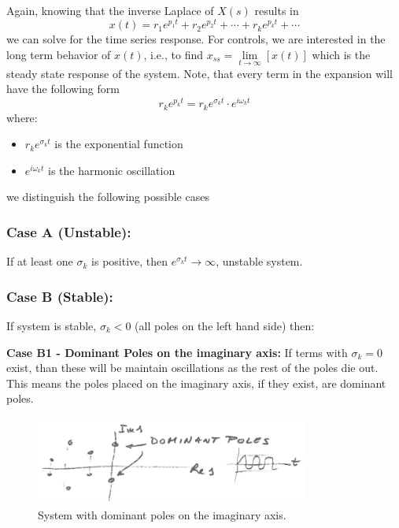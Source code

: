 \documentclass[12pt,letter]{article}
\numberwithin{ex}{section} %
\numberwithin{re}{section} %
\numberwithin{equation}{section}	%
\begin{document}
Again, knowing that the inverse Laplace of $X(s)$ results in
\begin{equation}
x(t) = r_1 e^{p_1t} + r_2 e^{p_2t} + \cdots + r_k e^{p_kt} + \cdots
\end{equation}
we can solve for the time series response. For controls, we are interested in the long term behavior of $x(t)$, i.e., to find $x_{ss} =  \lim\limits_{t\rightarrow \infty} [x(t)]$ which is the steady state response of the system. Note, that every term in the expansion will have the following form
\begin{equation}
r_k e^{p_kt} = r_ke^{\sigma_k t} \cdot e^{i \omega_k t}
\end{equation}
where: 
\begin{itemize}[noitemsep,topsep=0pt]
\item $r_ke^{\sigma_k t}$ is the exponential function
\item $e^{i \omega_k t}$ is the harmonic oscillation
\end{itemize}
we distinguish the following possible cases

\subsubsection{Case A (Unstable):}

If at least one $\sigma_k$ is positive, then $e^{\sigma_k t} \rightarrow \infty$, unstable system. 

\subsubsection{Case B  (Stable):} 

If system is stable, $\sigma_k<0$ (all poles on the left hand side) then:

\noindent \textbf{Case B1 - Dominant Poles on the imaginary axis:}  If terms with $\sigma_k=0$ exist, than these will be maintain oscillations as the rest of the poles die out. This means the poles placed on the imaginary axis, if they exist, are dominant poles. 


\begin{figure}[H]
	\centering
	\includegraphics[width=0.8\textwidth]{../figures/dominant_poles_B1.png}
	\caption{System with dominant poles on the imaginary axis.}
\end{figure}
\end{document}
